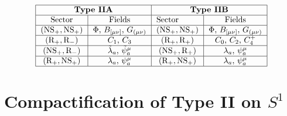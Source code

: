 \begin{equation}
        \begin{tabular}{|cc|cc|}
        \hline
        \multicolumn{2}{|c|}{\textbf{Type IIA}} & \multicolumn{2}{c|}{\textbf{Type IIB}} \\ \hline
        \multicolumn{1}{|c|}{Sector}  & Fields  & \multicolumn{1}{l|}{Sector}  & Fields  \\ \hline
        \multicolumn{1}{|c|}{$(\text{NS}_+, \text{NS}_+)$}        &    $\Phi$, $B_{[\mu\nu]}$, $G_{(\mu\nu)}$     & \multicolumn{1}{c|}{$(\text{NS}_+, \text{NS}_+)$}        &      $\Phi$, $B_{[\mu\nu]}$, $G_{(\mu\nu)}$   \\ \hline
        \multicolumn{1}{|c|}{$(\text{R}_+, \text{R}_-)$}        &     $C_1$, $C_3$    & \multicolumn{1}{c|}{$(\text{R}_+, \text{R}_+)$}        &    $C_0$, $C_2$, $C_4^+$     \\ \hline
        \multicolumn{1}{|c|}{$(\text{NS}_+,\text{R}_-)$}        &     $\tilde{\lambda}_a$, $\tilde{\psi}^\mu_a$    & \multicolumn{1}{c|}{$(\text{NS}_+,\text{R}_+)$}        &     ${\lambda}_a$, ${\psi}^\mu_a$    \\ \hline
        \multicolumn{1}{|c|}{$(\text{R}_+, \text{NS}_+)$}        &     ${\lambda}_a$, ${\psi}^\mu_a$    & \multicolumn{1}{c|}{$(\text{R}_+, \text{NS}_+)$}        &     ${\lambda}_a$, ${\psi}^\mu_a$    \\ \hline
        \end{tabular}
\end{equation}

\section{Compactification of Type II on \texorpdfstring{$S^1$}{S1}}